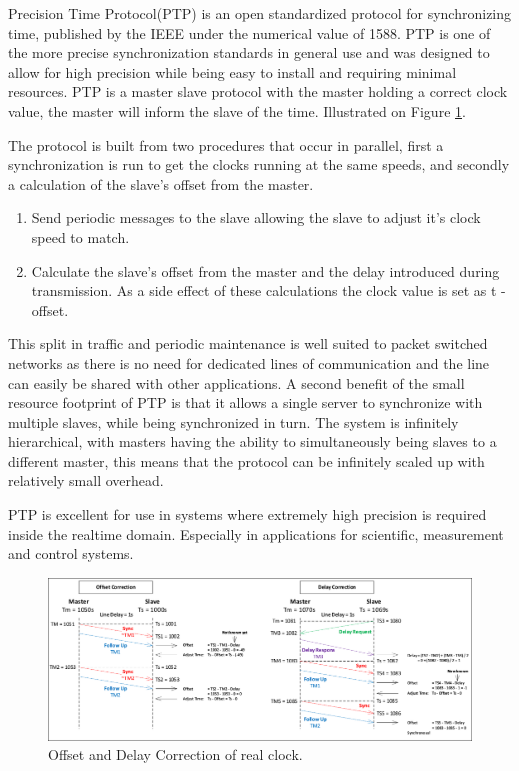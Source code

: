 Precision Time Protocol(PTP) is an open standardized protocol for synchronizing time, published by the IEEE under the numerical value of 1588. PTP is one of the more precise synchronization standards in general use and was designed to allow for high precision while being easy to install and requiring minimal resources. PTP is a master slave protocol with the master holding a correct clock value, the master will inform the slave of the time.  Illustrated on Figure \ref{fig:offsetAndDelayCorrection}.

The protocol is built from two procedures that occur in parallel, first a synchronization is run to get the clocks running at the same speeds, and secondly a calculation of the slave's offset from the master.
\begin{enumerate}
	\item Send periodic messages to the slave allowing the slave to adjust it's clock speed to match.
	\item Calculate the slave's offset from the master and the delay introduced during transmission. As a side effect of these calculations the clock value is set as t - offset.
\end{enumerate}

This split in traffic and periodic maintenance is well suited to packet switched networks as there is no need for dedicated lines of communication and the line can easily be shared with other applications. A second benefit of the small resource footprint of PTP is that it allows a single server to synchronize with multiple slaves, while being synchronized in turn. The system is infinitely hierarchical, with masters having the ability to simultaneously being slaves to a different master, this means that the protocol can be infinitely scaled up with relatively small overhead.

PTP is excellent for use in systems where extremely high precision is required  inside the realtime domain. Especially in applications for scientific, measurement and control systems.

\begin{figure}[H]
	\centering
	\includegraphics[width=\linewidth]{synchronization/realClock/fig/offsetAndDelayCorrection.pdf}
	\caption{Offset and Delay Correction of real clock.}
	\label{fig:offsetAndDelayCorrection}
\end{figure}